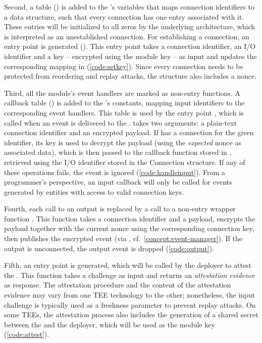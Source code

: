 Second, a table (\conntab) is added to the \protmod's variables that maps
connection identifiers to a \conn{} data structure, such that every connection
has one entry associated with it. These entries will be initialized to all zeros
by the underlying architecture, which is interpreted as an unestablished
connection. For establishing a connection, an entry point is generated
(\setkey).  This entry point takes a connection identifier, an I/O identifier
and a key -- encrypted using the module key -- as input and updates the
corresponding mapping in \conntab{} (\cref{code:setkey}). Since every connection
needs to be protected from reordering and replay attacks, the \conn{} structure
also includes a nonce.



Third, all the module's event handlers are marked as non-entry functions.  A
callback table (\cbtab) is added to the \protmod's constants, mapping input
identifiers to the corresponding event handlers.  This table is used by the
entry point \handleinput, which is called when an event is delivered to the
\protmod. \handleinput{} takes two arguments: a plain-text connection identifier
and an encrypted payload.  If \conntab{} has a connection for the given
identifier, its key is used to decrypt the payload (using the \emph{expected}
nonce as associated data), which is then passed to the callback function stored
in \cbtab, retrieved using the I/O identifier stored in the Connection
structure.  If any of these operations fails, the event is ignored
(\cref{code:handleinput}).  From a programmer's perspective, an input callback
will only be called for events generated by entities with access to valid
connection keys.

\label{concept:output-wrapper}
%
Fourth, each call to an output is replaced by a call to a non-entry wrapper
function \handleoutput{}.  This function takes a connection identifier and a
payload, encrypts the payload together with the current nonce using the
corresponding connection key, then publishes the encrypted event (via
\handlelocalevent, cf.~\ref{concept:event-manager}). If the output is
unconnected, the output event is dropped (\cref{code:output}).

Fifth, an entry point \attest{} is generated, which will be called by the
deployer to attest the \protmod{}. This function takes a challenge as input and
returns an \emph{attestation evidence} as response. The attestation procedure
and the content of the attestation evidence may vary from one \ac{TEE}
technology to the other; nonetheless, the input challenge is typically used as a
freshness parameter to prevent replay attacks. On some \acp{TEE}, the
attestation process also includes the generation of a shared secret between the
\protmod{} and the deployer, which will be used as the module key
(\cref{code:attest}).

